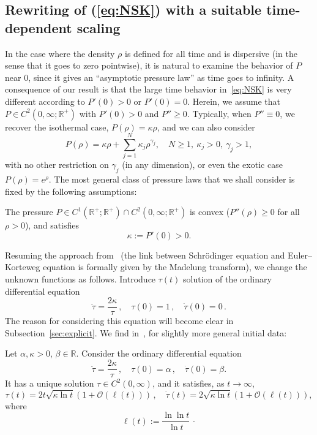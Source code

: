 \documentclass[AHL,Unicode,longabstracts]{cedram}
\newcommand*\R{\mathbb{R}}
\newcommand*\calO{\mathcal{O}}
\newcommand*\<{\left\langle}
\renewcommand*\>{\right\rangle}
\renewcommand*\ge{\geqslant}
\begin{document}
\subsection{Rewriting of (\ref{eq:NSK}) with a suitable time-dependent scaling}\label{sec:large-time}

In the case where the density $\rho$ is defined for all time and is dispersive (in the sense that it goes to zero pointwise), it is natural to examine the behavior of $P$ near $0$, since it gives an ``asymptotic pressure law'' as time goes to infinity. A consequence of our result is that the large time behavior in~\eqref{eq:NSK} is very different according to $P'(0)>0$ or $P'(0)=0$. Herein, we assume that $P\in C^2(0,\infty;\R^+)$ with $P'(0)>0$ and $P''\ge 0$. Typically, when $P''\equiv 0$, we recover the isothermal case, $P(\rho)=\kappa\rho$, and we can also consider
\begin{equation*}
P(\rho)=\kappa \rho +\sum_{j=1}^N
\kappa_j\rho^{\gamma_j},\quad N\ge 1,\ \kappa_j>0,\ \gamma_j>1,
\end{equation*}
with no other restriction on $\gamma_j$ (in any dimension), or even the exotic case $P(\rho)=e^\rho$. The most general class of pressure laws that we shall consider is fixed by the following assumptions:

\begin{hyp}\label{hyp:P-temps-long}
The pressure $P\in C^1(\R^+;\R^+)\cap C^2(0,\infty;\R^+)$ is convex ($P''(\rho)\ge 0$ for all $\rho> 0$), and satisfies
\[
\kappa:=P'(0)>0.
\]
\end{hyp}

Resuming the approach from~\cite{CaGa18} (the link between Schr\"odinger equation and Euler--Korteweg equation is formally given by the Madelung transform), we change the unknown functions as follows. Introduce $\tau(t)$ solution of the ordinary differential equation
\begin{equation}\label{eq:tau}
\ddot \tau = \frac{2\kappa }{\tau} \,,\quad \tau(0)=1\,,\quad \dot
\tau(0)=0\,.
\end{equation}
The reason for considering this equation will become clear in Subsection~\ref{sec:explicit}. We find in~\cite{CaGa18}, for slightly more general initial data:

\begin{lemm}\label{lem:taubis}
Let $\alpha,\kappa>0$, $\beta\in \R$. Consider the ordinary differential equation
\begin{equation}\label{eq:taugen}
\ddot \tau = \frac{2\kappa }{\tau} \,,\quad \tau(0)=\alpha\,,\quad \dot
\tau(0)=\beta.
\end{equation}
It has a unique solution $\tau\in C^2(0,\infty)$, and it satisfies, as $t\to \infty$,
\begin{equation*}
\tau(t)= 2t \sqrt{\kappa \ln t}\left(1+\calO(\ell(t))\right) \,,\quad \dot
\tau(t)=2\sqrt{\kappa\ln t}\left(1+\calO(\ell(t))\right),
\end{equation*}
where
\begin{equation*}
\ell (t):= \frac{\ln \ln t}{ \ln t} \, \cdotp
\end{equation*}
\end{lemm}
\end{document}
